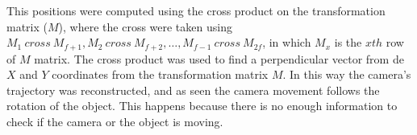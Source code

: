 \documentclass[12pt,a4paper]{article}
\begin{document}
This positions were computed using the cross product on the transformation matrix ($M$), where the cross were taken using $M_1 \ cross \ M_{f+1}, M_2 \ cross \ M_{f+2}, \dotso, M_{f-1} \ cross \ M_{2f}$, in which $M_x$ is the $xth$ row of $M$ matrix. The cross product was used to find a perpendicular vector from de $X$ and $Y$ coordinates from the transformation matrix $M$. In this way the camera's trajectory was reconstructed, and as seen the camera movement follows the rotation of the object. This happens because there is no enough information to check if the camera or the object is moving. \\



 
\end{document}
